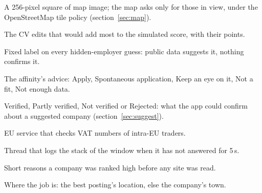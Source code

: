 \begin{description}[style=unboxed, leftmargin=1.2em, itemsep=2pt, font=\normalfont\bfseries\color{othDark}]
\item[Tile] A 256-pixel square of map image; the map asks only for those in view, under the OpenStreetMap tile policy (section~\ref{sec:map}).
\item[Top fixes] The CV edits that would add most to the simulated score, with their points.
\item[Unverified hypothesis] Fixed label on every hidden-employer guess: public data suggests it, nothing confirms it.
\item[Verdict] The affinity's advice: Apply, Spontaneous application, Keep an eye on it, Not a fit, Not enough data.
\item[Verification status] Verified, Partly verified, Not verified or Rejected: what the app could confirm about a suggested company (section~\ref{sec:suggest}).
\item[VIES] EU service that checks VAT numbers of intra-EU traders.
\item[Watchdog] Thread that logs the stack of the window when it has not answered for 5\,s.
\item[Why selected] Short reasons a company was ranked high before any site was read.
\item[Workplace] Where the job is: the best posting's location, else the company's town.
\end{description}
